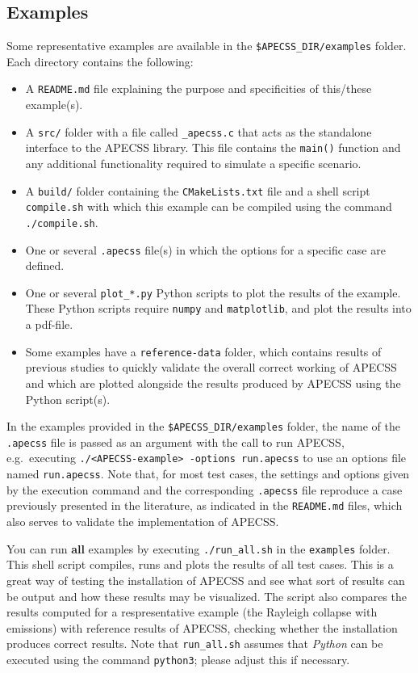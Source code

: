 \subsection{Examples}

Some representative examples are available in the {\tt \$APECSS\_DIR/examples} folder. Each directory contains the following:\vspace{-1em}
\begin{itemize}[noitemsep]
  \item A {\tt README.md} file explaining the purpose and specificities of this/these example(s).
  \item A {\tt src/} folder with a file called {\tt *\_apecss.c} that acts as the standalone interface to the APECSS library. This file contains the {\tt main()} function and any additional functionality required to simulate a specific scenario.
  \item A {\tt build/} folder containing the {\tt CMakeLists.txt} file and a shell script {\tt compile.sh} with which this example can be compiled using the command {\tt ./compile.sh}.
  \item One or several {\tt *.apecss} file(s) in which the options for a specific case are defined.
  \item One or several {\tt plot\_*.py} Python scripts to plot the results of the example. These Python scripts require {\tt numpy} and {\tt matplotlib}, and plot the results into a pdf-file. 
  \item Some examples have a {\tt reference-data} folder, which contains results of previous studies to quickly validate the overall correct working of APECSS and which are plotted alongside the results produced by APECSS using the Python script(s).
\end{itemize}

In the examples provided in the {\tt \$APECSS\_DIR/examples} folder, the name of the  {\tt *.apecss} file is passed as an argument with the call to run APECSS, e.g.~executing {\tt ./<APECSS-example> -options run.apecss} to use an options file named {\tt run.apecss}. Note that, for most test cases, the settings and options given by the execution command and the corresponding {\tt *.apecss} file reproduce a case previously presented in the literature, as indicated in the {\tt README.md} files, which also serves to validate the implementation of APECSS.

You can run \textbf{all} examples by executing {\tt ./run\_all.sh} in the {\tt examples} folder. This shell script compiles, runs and plots the results of all test cases. This is a great way of testing the installation of APECSS and see what sort of results can be output and how these results may be visualized. The script also compares the results computed for a respresentative example (the Rayleigh collapse with emissions) with reference results of APECSS, checking whether the installation produces correct results. Note that {\tt run\_all.sh} assumes that \textit{Python} can be executed using the command {\tt python3}; please adjust this if necessary.

